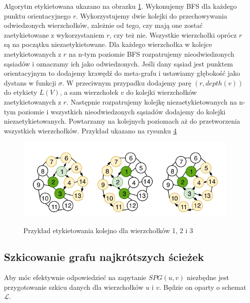 \documentclass{article}
\theoremstyle{definition}
\begin{document}
            Algorytm etykietowana ukazano na obrazku \hyperref[fig:alg2]{1}. Wykonujemy BFS dla każdego punktu orientacyjnego $r$. Wykorzystujemy dwie kolejki do przechowywania odwiedzonych wierzchołków, zależnie od tego, czy mają one zostać zaetykietowane z wykorzystaniem $r$, czy też nie. Wszystkie wierzchołki oprócz $r$ są na początku niezaetykietowane. Dla każdego wierzchołka w kolejce zaetykietowanych z $r$ na n-tym poziomie BFS rozpatrujemy nieodwiedzonych sąsiadów i oznaczamy ich jako odwiedzonych. Jeśli dany sąsiad jest punktem orientacyjnym to dodajemy krawędź do meta-grafu i ustawiamy głębokość jako dystans w funkcji $\sigma$. W przeciwnym przypadku dodajemy parę $(r, depth(v))$ do etykiety $L(V)$, a sam wierzchołek $v$ do kolejki wierzchołków zaetykietowanych z $r$. Następnie rozpatrujemy kolejkę niezaetykietowanych na n-tym poziomie i wszystkich nieodwiedzonych sąsiadów dodajemy do kolejki niezaetykietowanych. Powtarzamy na kolejnych poziomach aż do przetworzenia wszystkich wierzchołków. Przykład ukazano na rysunku \hyperref[fig:label]{4}

            \begin{figure}[!tbh]
                \includegraphics[width=11cm]{img/labelling.png}
                \centering
                \label{fig:label}
                \caption{Przykład etykietowania kolejno dla wierzchołków 1, 2 i 3}
            \end{figure}

    \subsection{Szkicowanie grafu najkrótszych ścieżek}
        Aby móc efektywnie odpowiedzieć na zapytanie $SPG(u,v)$ niezbędne jest przygotowanie szkicu danych dla wierzchołków $u$ i $v$. Będzie on oparty o schemat $\mathcal{L}$.
        
\end{document}
